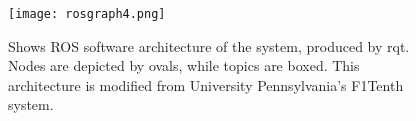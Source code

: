 \documentclass[conference]{IEEEtran}
\begin{document}








\begin{figure}
    \centering
    \texttt{[image: rosgraph4.png]}
    \caption{Shows ROS software architecture of the system, produced by rqt. Nodes are depicted by ovals, while topics are boxed. This architecture is modified from University Pennsylvania's F1Tenth system.}
    \label{Figure 9}
\end{figure}
\end{document}

